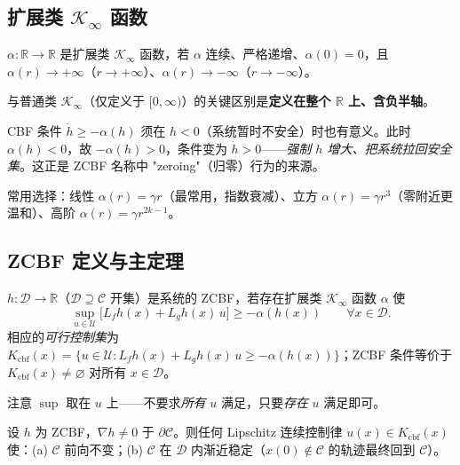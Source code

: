 \subsection{扩展类 \texorpdfstring{$\mathcal K_\infty$}{K-infinity} 函数}

\begin{definition}\label{def:ext-kinf}
$\alpha:\mathbb R\to\mathbb R$ 是扩展类 $\mathcal K_\infty$ 函数，若 $\alpha$ 连续、严格递增、$\alpha(0)=0$，且 $\alpha(r)\to+\infty$（$r\to+\infty$）、$\alpha(r)\to-\infty$（$r\to-\infty$）。
\end{definition}

与普通类 $\mathcal K_\infty$（仅定义于 $[0,\infty)$）的关键区别是\textbf{定义在整个 $\mathbb R$ 上、含负半轴}。

\begin{insight}[为何必须扩到负半轴]
CBF 条件 $\dot h\ge-\alpha(h)$ 须在 $h<0$（系统暂时不安全）时也有意义。此时 $\alpha(h)<0$，故 $-\alpha(h)>0$，条件变为 $\dot h>0$——\emph{强制 $h$ 增大、把系统拉回安全集}。这正是 ZCBF 名称中 "zeroing"（归零）行为的来源。
\end{insight}

常用选择：线性 $\alpha(r)=\gamma r$（最常用，指数衰减）、立方 $\alpha(r)=\gamma r^3$（零附近更温和）、高阶 $\alpha(r)=\gamma r^{2k-1}$。

\subsection{ZCBF 定义与主定理}

\begin{definition}\label{def:zcbf}
$h:\mathcal D\to\mathbb R$（$\mathcal D\supseteq\mathcal C$ 开集）是系统的 ZCBF，若存在扩展类 $\mathcal K_\infty$ 函数 $\alpha$ 使
\begin{equation}
\sup_{u\in\mathcal U}\big[L_fh(x)+L_gh(x)\,u\big]\ge-\alpha(h(x))\qquad\forall x\in\mathcal D.
\label{eq:zcbf}
\end{equation}
相应的\emph{可行控制集}为 $K_{\mathrm{cbf}}(x)=\{u\in\mathcal U:L_fh(x)+L_gh(x)\,u\ge-\alpha(h(x))\}$；ZCBF 条件等价于 $K_{\mathrm{cbf}}(x)\neq\varnothing$ 对所有 $x\in\mathcal D$。
\end{definition}

注意 $\sup$ 取在 $u$ 上——不要求\emph{所有} $u$ 满足，只要\emph{存在} $u$ 满足即可。

\begin{theorem}\label{thm:cbf-main}
设 $h$ 为 ZCBF，$\nabla h\neq0$ 于 $\partial\mathcal C$。则任何 Lipschitz 连续控制律 $u(x)\in K_{\mathrm{cbf}}(x)$ 使：(a) $\mathcal C$ 前向不变；(b) $\mathcal C$ 在 $\mathcal D$ 内渐近稳定（$x(0)\notin\mathcal C$ 的轨迹最终回到 $\mathcal C$）。
\end{theorem}

